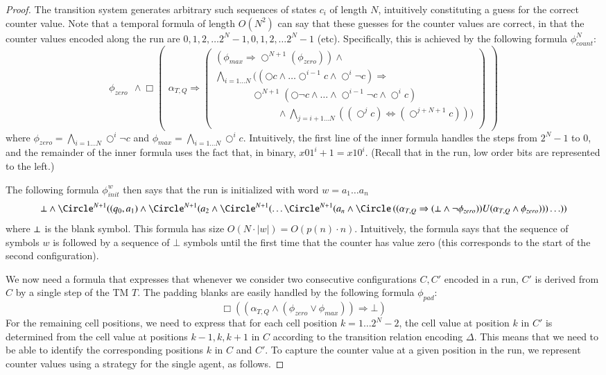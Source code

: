 \documentclass[a4wide]{article}
\newcommand{\until}{U}
\newcommand{\dimp}{\Leftrightarrow}
\theoremstyle{examplesty}
\newcommand{\rimp}{\Rightarrow}
\newcommand{\nxt}{\Circle}
\begin{document}
\begin{proof}
The transition system generates arbitrary such sequences of states $c_i$ of length $N$, intuitively constituting
a guess for the correct counter value. 
Note that a temporal formula of length $O(N^2)$ can say that these guesses for the
counter values are correct, in that the counter values encoded along the run are $0, 1, 2,\ldots  2^N-1, 0, 1, 2,\ldots 2^N-1$ (etc). 
Specifically, this is achieved by the following formula $\phi^N_{count}$: 
$$ 
\phi_{zero}~~\land 
\Box \left ( 
\begin{array}{l} 
\alpha_{T,Q} \rimp 
 
\left(
\begin{array}{l} 
( \phi_{max}  \rimp \nxt^{N+1}(\phi_{zero})) \land \\[5pt] 
\bigwedge_{i=1\ldots N} ((\nxt c \land \ldots \nxt^{i-1} c \land \nxt^i \neg c) \rimp \\ 
~~~~~~~~~~~~~~~~~
\nxt^{N+1} ( \nxt \neg c \land \ldots  \land \nxt^{i-1} \neg c \land  \nxt^i c)  \\
~~~~~~~~~~~~~~~~~~~~~~~~~~~~~\land\bigwedge_{j=i+1\ldots N} ( (\nxt^j c) \dimp (\nxt^{j+N+1} c)))\\ 

\end{array}\right )  
\end{array}\right ) 
$$ 
where $\phi_{zero} = \bigwedge_{i=1\ldots N} \nxt^i \neg c$ and $\phi_{max} = \bigwedge_{i=1\ldots N} \nxt^i  c$. 
Intuitively, the first line of the inner formula handles the steps from $2^N-1$ to $0$, and the remainder of the inner formula 
uses the fact that, in binary, $x01^i + 1 = x10^i$.
(Recall that in the run, low order bits are represented to the left.) 

The following formula $\phi^w_{init}$ then says that the run is initialized with word $w=a_1\dots a_n$ 
$$ \blnk \land \nxt^{N+1} ((q_0,a_1) \land \nxt^{N+1}( a_2 \land  \nxt^{N+1} (\ldots  \nxt^{N+1} (a_n \land \nxt \, 
((\alpha_{T,Q} \rimp (\blnk\land \neg \phi_{zero})) 
\until (\alpha_{T,Q}\land \phi_{zero})))\ldots ))$$ 
where $\bot$ is the blank symbol.   This formula has size $O(N\cdot |w|) = O(p(n)\cdot n)$. 
Intuitively, the formula says that the sequence of symbols $w$ is followed by a sequence of $\bot$ symbols 
until 
the first time that the counter has value zero (this corresponds to the start of the second configuration). 

We now need a formula that expresses that whenever we consider two consecutive configurations $C, C'$
encoded in a run, $C'$ is derived from $C$ by a single step of the TM $T$. The padding 
blanks are easily handled by the following formula $\phi_{pad}$: 
$$ 
\Box ((\alpha_{T,Q} \land ( \phi_{zero} \lor \phi_{max})) \rimp \bot )
$$  
For the remaining cell positions, we need to express that for each cell position $k=1\ldots 2^N-2$, the cell value at 
position $k$ in $C'$ is determined from the cell value at positions $k-1, k,k+1$ in $C$ according
to the transition relation encoding $\Delta$. This means that we need to be able to identify the 
corresponding positions $k$ in $C$ and $C'$. 
To capture the counter value at a given position in the run, 
we represent counter values using a strategy for the single agent, 
as follows. 


\end{proof}
\end{document}
